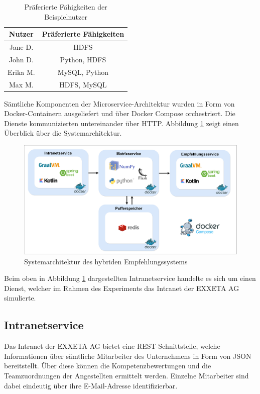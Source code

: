 \begin{table}[h]
	\centering
	\begin{tabular}{c|c}
		\textbf{Nutzer} & \textbf{Präferierte Fähigkeiten}\\
		\hline
		Jane D.     & HDFS\\
		John D.     & Python, HDFS\\
		Erika M.    & MySQL, Python\\
		Max M.      & HDFS, MySQL
	\end{tabular}
	\caption{Präferierte Fähigkeiten der Beispielnutzer}
	\label{tbl:methodik:versuchsaufbau:systemarchitektur:tbl1}
\end{table}

Sämtliche Komponenten der Microservice-Architektur wurden in Form von Docker-Containern ausgeliefert und über Docker Compose orchestriert. Die Dienste kommunizierten untereinander über HTTP. Abbildung \ref{fig:methodik:systemarchitekturn:abb1} zeigt einen Überblick über die Systemarchitektur.

\begin{figure}[h]
	\centering
	\includegraphics[width=1\textwidth]{gfx/ArchitekturMitLinie.jpg}
	\caption{Systemarchitektur des hybriden Empfehlungssystems}
	\label{fig:methodik:systemarchitekturn:abb1}
\end{figure}

Beim oben in Abbildung \ref{fig:methodik:systemarchitekturn:abb1} dargestellten Intranetservice handelte es sich um einen Dienst, welcher im Rahmen des Experiments das Intranet der EXXETA AG simulierte.

\subsection{Intranetservice}
\label{ch:methodik:versuchsaufbau:systemarchitektur:intranetservice}
Das Intranet der EXXETA AG bietet eine REST-Schnittstelle, welche Informationen über sämtliche Mitarbeiter des Unternehmens in Form von JSON bereitstellt. Über diese können die Kompetenzbewertungen und die Teamzuordnungen der Angestellten ermittelt werden. Einzelne Mitarbeiter sind dabei eindeutig über ihre E-Mail-Adresse identifizierbar.

